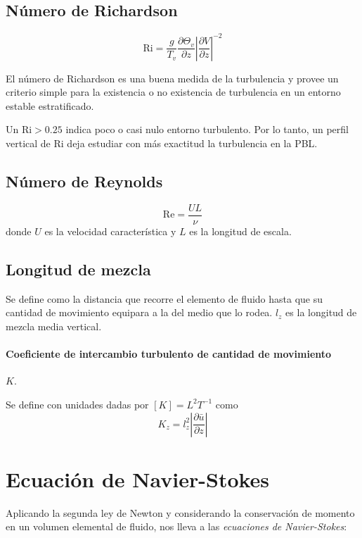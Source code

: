 \documentclass[openany]{book}
\begin{document}
\subsection{Número de Richardson}
\begin{equation}
    \mathrm{Ri}=\frac{g}{T_{v}}\frac{\partial \Theta_{v}}{\partial z}\left|\frac{\partial V}{\partial z}\right|^{-2}
\end{equation}
\par El número de Richardson es una buena medida de la 
turbulencia y provee un criterio simple para la existencia o no 
existencia de turbulencia en un entorno estable estratificado.
\par Un $\mathrm{Ri}>0.25$ indica poco o casi nulo entorno 
turbulento. Por lo tanto, un perfil vertical de $\mathrm{Ri}$ 
deja estudiar con más exactitud la turbulencia en la PBL.

\subsection{Número de Reynolds}
\begin{equation}
    \mathrm{Re}=\frac{UL}{\nu}
\end{equation}
donde $U$ es la velocidad característica y $L$ es la longitud de 
escala.

\subsection{Longitud de mezcla}
Se define como la distancia que recorre el elemento de fluido hasta que
su cantidad de movimiento equipara a la del medio que lo rodea. $l_z$
es la longitud de mezcla media vertical.

\paragraph{Coeficiente de intercambio turbulento de cantidad de movimiento}
$K$.
\par Se define con unidades dadas por $[K]=L^{2}T^{-1}$ como 
\begin{equation}
    K_{z}=l_{z}^{2}\left|\frac{\partial \bar{u}}{\partial z}\right|
\end{equation}

\section{Ecuación de Navier-Stokes}
Aplicando la segunda ley de Newton y considerando la 
conservación de momento en un volumen elemental de fluido, 
nos lleva a las \emph{ecuaciones de Navier-Stokes}:
\end{document}
